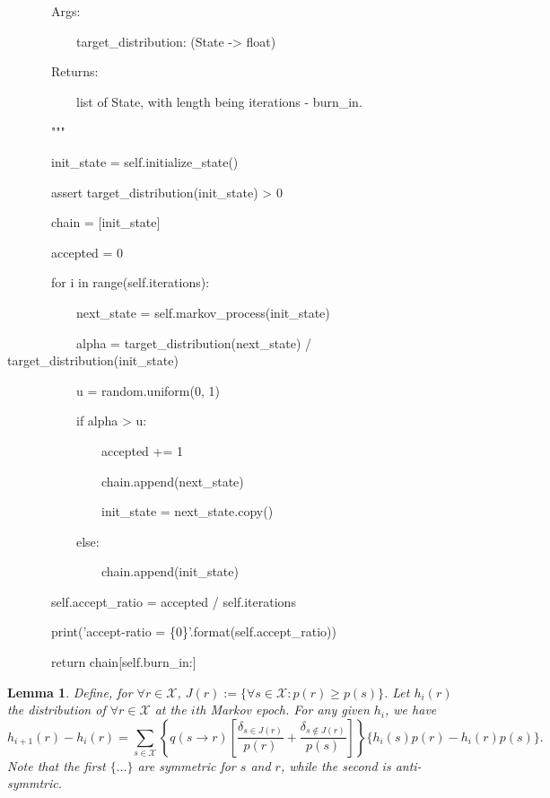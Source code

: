 \documentclass{article}
\newcommand{\assign}{:=}
\newcommand{\nin}{\not\in}
\newtheorem{lemma}{Lemma}
\begin{document}
{{\ \ \ \ \ \ \ Args:

\ \ \ \ \ \ \ \ \ \ \ target\_distribution: (State -> float)



\ \ \ \ \ \ \ Returns:

\ \ \ \ \ \ \ \ \ \ \ list of State, with length being iterations - burn\_in.

\ \ \ \ \ \ \ """



\ \ \ \ \ \ \ init\_state = self.initialize\_state()

\ \ \ \ \ \ \ assert target\_distribution(init\_state) > 0



\ \ \ \ \ \ \ chain = [init\_state]

\ \ \ \ \ \ \ accepted = 0



\ \ \ \ \ \ \ for i in range(self.iterations):



\ \ \ \ \ \ \ \ \ \ \ next\_state = self.markov\_process(init\_state)



\ \ \ \ \ \ \ \ \ \ \ alpha = target\_distribution(next\_state) /
target\_distribution(init\_state)

\ \ \ \ \ \ \ \ \ \ \ u = random.uniform(0, 1)



\ \ \ \ \ \ \ \ \ \ \ if alpha > u:



\ \ \ \ \ \ \ \ \ \ \ \ \ \ \ accepted += 1

\ \ \ \ \ \ \ \ \ \ \ \ \ \ \ chain.append(next\_state)



\ \ \ \ \ \ \ \ \ \ \ \ \ \ \ init\_state = next\_state.copy()



\ \ \ \ \ \ \ \ \ \ \ else:



\ \ \ \ \ \ \ \ \ \ \ \ \ \ \ chain.append(init\_state)



\ \ \ \ \ \ \ self.accept\_ratio = accepted / self.iterations

\ \ \ \ \ \ \ print('accept-ratio = \{0\}'.format(self.accept\_ratio))



\ \ \ \ \ \ \ return chain[self.burn\_in:]}}

\begin{lemma}
  \label{lemma: transition}Define, for $\forall r \in \mathcal{X}$, $J ( r )
  \assign \{ \forall s \in \mathcal{X} : p ( r ) \geqslant p ( s ) \}$. Let
  $h_{i} ( r )$ the distribution of $\forall r \in \mathcal{X}$ at the $i$th
  Markov epoch. For any given $h_{i}$, we have
  \[ h_{i+1} ( r ) -h_{i} ( r ) = \sum_{s \in \mathcal{X}} \left\{ q ( s
     \rightarrow r ) \left[   \frac{\delta_{s \in J ( r )}}{p ( r )} +
     \frac{\delta_{s \nin J ( r )}}{p ( s )} \right] \right\}   \{ h_{i} ( s )
     p ( r ) -h_{i} ( r )  p ( s ) \} . \]
  Note that the first $\{ \ldots \}$ are symmetric for $s$ and $r$, while the
  second is anti-symmtric.
\end{lemma}
\end{document}
